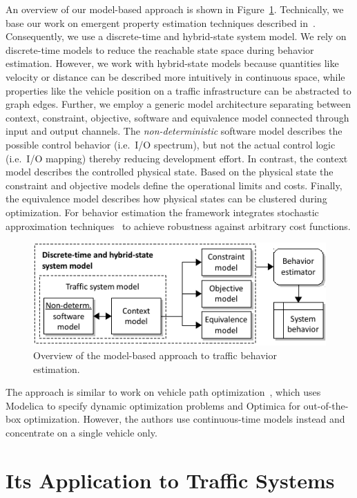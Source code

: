 \documentclass[conference]{../cls/IEEEtran}
\begin{document}
An overview of our model-based approach is shown in Figure~\ref{fig:framework}. Technically, we base our work on emergent property estimation techniques described in~\cite{Hackenberg2012}. Consequently, we use a discrete-time and hybrid-state system model. We rely on discrete-time models to reduce the reachable state space during behavior estimation. However, we work with hybrid-state models because quantities like velocity or distance can be described more intuitively in continuous space, while properties like the vehicle position on a traffic infrastructure can be abstracted to graph edges. Further, we employ a generic model architecture separating between context, constraint, objective, software and equivalence model connected through input and output channels. The \textit{non-deterministic} software model describes the possible control behavior (i.e.\ I/O spectrum), but not the actual control logic (i.e.\ I/O mapping) thereby reducing development effort. In contrast, the context model describes the controlled physical state. Based on the physical state the constraint and objective models define the operational limits and costs. Finally, the equivalence model describes how physical states can be clustered during optimization. For behavior estimation the framework integrates stochastic approximation techniques~\cite{Pereira1991} to achieve robustness against arbitrary cost functions.

\begin{figure}[h]
	\centering
	\includegraphics{../gfx/framework.pdf}
	\caption{Overview of the model-based approach to traffic behavior estimation.}
	\label{fig:framework}
\end{figure}

The approach is similar to work on vehicle path optimization~\cite{Danielsson2007}, which uses Modelica to specify dynamic optimization problems and Optimica for out-of-the-box optimization. However, the authors use continuous-time models instead and concentrate on a single vehicle only.

\section{Its Application to Traffic Systems}
\end{document}

